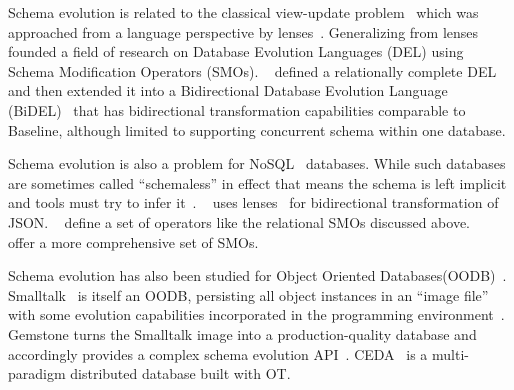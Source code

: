 \documentclass[english,submission]{programming}
\theoremstyle{definition}
\newcommand{\citet}[1]{\citeauthor*{#1}~\cite{#1}}
\begin{document}
Schema evolution is related to the classical view-update problem~\cite{Bancilhon81} which was approached from a language perspective by lenses~\cite{Foster2007}. Generalizing from lenses \citet{curino08} founded a field of research on Database Evolution Languages (DEL) using Schema Modification Operators (SMOs).
 \citet{herrmann15} defined a relationally complete DEL and then extended it into a Bidirectional Database Evolution Language (BiDEL)~\cite{herrmann17} that has bidirectional transformation capabilities comparable to Baseline, although limited to supporting concurrent schema within one database.

Schema evolution is also a problem for NoSQL~\cite{sadalage12} databases. While such databases are sometimes called ``schemaless'' in effect that means the schema is left implicit and tools must try to infer it~\cite{storl20, storl22}. \citet{Cambria} uses lenses~\cite{Foster2007} for bidirectional transformation of JSON. \citet{scherzinger13} define a set of operators like the relational SMOs discussed above. \citeauthor*{chillon21}~\cite{chillon21, chillon22} offer a more comprehensive set of SMOs.

Schema evolution has also been studied for Object Oriented Databases(OODB)~\cite{li99, banerjee87}. Smalltalk~\cite{Goldberg80} is itself an OODB, persisting all object instances in an ``image file'' with some evolution capabilities incorporated in the programming environment~\cite[pp.252-272]{Goldberg80}. Gemstone turns the Smalltalk image into a production-quality database and accordingly provides a complex schema evolution API~\cite{Gemstone}. CEDA~\cite{ceda} is a multi-paradigm distributed database built with OT.
\end{document}
